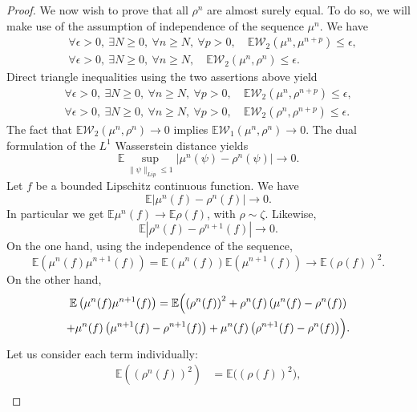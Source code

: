 \begin{proof}
We now wish to prove that all $\rho^n$ are almost surely equal. To do so, we will make use of the assumption of independence of the sequence $\mu^n$. We have
\begin{align*}
&\forall \epsilon>0,\ \exists N\geq0,\ \forall n\geq N,\ \forall p>0,\quad \mathbb{E}\mathcal{W}_2\left(\mu^n,\mu^{n+p}\right)\leq\epsilon,\\
&\forall \epsilon>0,\ \exists N\geq0,\ \forall n\geq N,\quad \mathbb{E}\mathcal{W}_2\left(\mu^n,\rho^n\right)\leq\epsilon.
\end{align*}
Direct triangle inequalities using the two assertions above yield
\begin{align*}
\forall \epsilon>0,\ \exists N\geq0,\ \forall n\geq N,\ \forall p>0,\quad \mathbb{E}\mathcal{W}_2\left(\mu^n,\rho^{n+p}\right)\leq\epsilon,\\
\forall \epsilon>0,\ \exists N\geq0,\ \forall n\geq N,\ \forall p>0,\quad\mathbb{E}\mathcal{W}_2\left(\rho^n,\rho^{n+p}\right)\leq\epsilon.
\end{align*}
The fact that $\mathbb{E}\mathcal{W}_2\left(\mu^n,\rho^n\right)\to 0$ implies $\mathbb{E}\mathcal{W}_1\left(\mu^n,\rho^n\right)\to 0$. The dual formulation of the $L^1$ Wasserstein distance yields
\[
\mathbb{E}\sup_{\|\psi\|_{Lip}\leq1}\left|\mu^n(\psi)-\rho^n(\psi)\right|\to 0.
\]
Let $f$ be a bounded Lipschitz continuous function. We have
\begin{equation}
\mathbb{E}\left|\mu^n(f)-\rho^n(f)\right|\to0\label{Convergence_lip}.
\end{equation}
In particular we get $\mathbb{E}\mu^n(f)\to\mathbb{E}\rho(f)$, with $\rho\sim\zeta$. Likewise,
\begin{equation}
\mathbb{E}\left|\rho^n(f)-\rho^{n+1}(f)\right|\to0\label{Convergence_lip_2}.
\end{equation}
On the one hand, using the independence of the sequence,
\[
\mathbb{E}\left(\mu^{n}(f)\mu^{n+1}(f)\right)=\mathbb{E}\left(\mu^{n}(f)\right)\mathbb{E}\left(\mu^{n+1}(f)\right)\to \mathbb{E}\left(\rho(f)\right)^2.
\]
On the other hand,
\begin{multline*}
\mathbb{E}\left(\mu^{n}(f)\mu^{n+1}(f)\right)=\mathbb{E}\Bigl(\left(\rho^n(f)\right)^2+\rho^n(f)\left(\mu^n(f)-\rho^n(f)\right)\\
+\mu^n(f)\left(\mu^{n+1}(f)-\rho^{n+1}(f)\right)
+\mu^n(f)\left(\rho^{n+1}(f)-\rho^{n}(f)\right)\Bigr).
\end{multline*}
Let us consider each term individually:
\begin{align*}
\mathbb{E}\left(\left(\rho^n(f)\right)^2\right)&=\mathbb{E}\bigl(\left(\rho(f)\right)^2\bigr),\\

\end{align*}
\end{proof}
